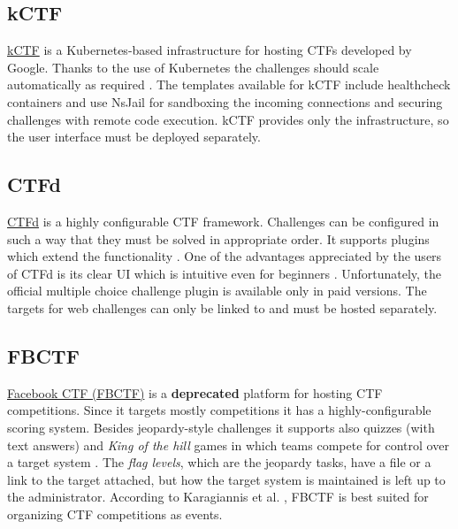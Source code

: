 \subsection{kCTF}

\href{https://github.com/google/kctf}{kCTF} is a Kubernetes-based infrastructure for hosting CTFs developed by Google. Thanks to the use of Kubernetes the challenges should scale automatically as required \cite{bib:kCTF-in-8-min, bib:kCTF-CTF-playbook}. The templates available for kCTF include healthcheck containers and use NsJail for sandboxing the incoming connections and securing challenges with remote code execution. kCTF provides only the infrastructure, so the user interface must be deployed separately.

\subsection{CTFd}
\label{ssec:CTFd}

\href{https://github.com/CTFd/CTFd}{CTFd} is a highly configurable CTF framework. Challenges can be configured in such a way that they must be solved in appropriate order. It supports plugins which extend the functionality \cite{bib:CTFd-GitHub}. One of the advantages appreciated by the users of CTFd is its clear UI which is intuitive even for beginners \cite{bib:CTF-analysis, bib:bangladesh-CTFd}. Unfortunately, the official multiple choice challenge plugin is available only in paid versions. The targets for web challenges can only be linked to and must be hosted separately.

\subsection{FBCTF}
\label{ssec:FBCTF}

\href{https://github.com/facebookarchive/fbctf}{Facebook CTF (FBCTF)} is a \textbf{deprecated} platform for hosting CTF competitions. Since it targets mostly competitions it has a highly-configurable scoring system. Besides jeopardy-style challenges it supports also quizzes (with text answers) and \textit{King of the hill} games in which teams compete for control over a target system \cite{bib:FBCTF-GitHub}. The \textit{flag levels}, which are the jeopardy tasks, have a file or a link to the target attached, but how the target system is maintained is left up to the administrator. According to Karagiannis et al. \cite{bib:CTF-analysis}, FBCTF is best suited for organizing CTF competitions as events.

